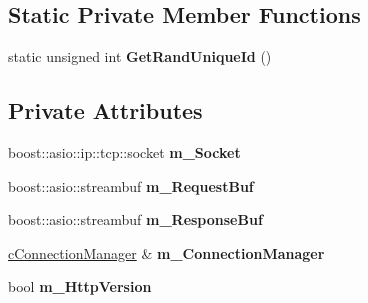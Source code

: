 \subsection*{\-Static \-Private \-Member \-Functions}
\begin{DoxyCompactItemize}
\item 
\hypertarget{classhttp__server_1_1cHttpConnection_ae4193c0d2fcd91ee80849f0982b4fe14}{static unsigned int {\bfseries \-Get\-Rand\-Unique\-Id} ()}\label{classhttp__server_1_1cHttpConnection_ae4193c0d2fcd91ee80849f0982b4fe14}

\end{DoxyCompactItemize}
\subsection*{\-Private \-Attributes}
\begin{DoxyCompactItemize}
\item 
\hypertarget{classhttp__server_1_1cHttpConnection_acf6b64550b0e0f8287d7b55a5613ef0f}{boost\-::asio\-::ip\-::tcp\-::socket {\bfseries m\-\_\-\-Socket}}\label{classhttp__server_1_1cHttpConnection_acf6b64550b0e0f8287d7b55a5613ef0f}

\item 
\hypertarget{classhttp__server_1_1cHttpConnection_a0504245e3903f238ff13145a832d4582}{boost\-::asio\-::streambuf {\bfseries m\-\_\-\-Request\-Buf}}\label{classhttp__server_1_1cHttpConnection_a0504245e3903f238ff13145a832d4582}

\item 
\hypertarget{classhttp__server_1_1cHttpConnection_a6f99bd0fa66b31461010ef0948fa428f}{boost\-::asio\-::streambuf {\bfseries m\-\_\-\-Response\-Buf}}\label{classhttp__server_1_1cHttpConnection_a6f99bd0fa66b31461010ef0948fa428f}

\item 
\hypertarget{classhttp__server_1_1cHttpConnection_adea2cf9ab3ff28fd70c9a910ef9bfda3}{\hyperlink{classhttp__server_1_1cConnectionManager}{c\-Connection\-Manager} \& {\bfseries m\-\_\-\-Connection\-Manager}}\label{classhttp__server_1_1cHttpConnection_adea2cf9ab3ff28fd70c9a910ef9bfda3}

\item 
\hypertarget{classhttp__server_1_1cHttpConnection_a785dff3fa5be6e114762738aae4d031e}{bool {\bfseries m\-\_\-\-Http\-Version}}\label{classhttp__server_1_1cHttpConnection_a785dff3fa5be6e114762738aae4d031e}

\end{DoxyCompactItemize}
